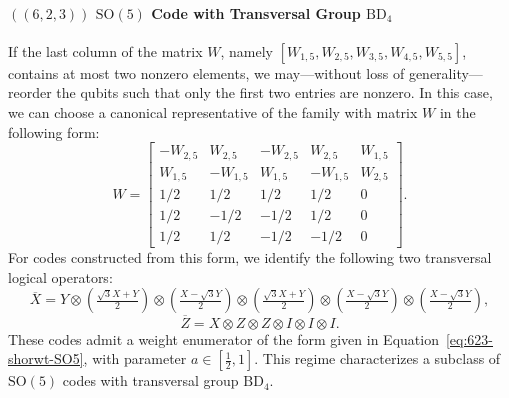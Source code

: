 \documentclass[8pt]{article}
\theoremstyle{definition}
\begin{document}
\paragraph{\texorpdfstring{$((6,2,3))$}{((6,2,3))} \texorpdfstring{$\mathrm{SO}(5)$}{SO(5)} Code with Transversal Group \texorpdfstring{$\mathrm{BD}_4$}{BD₄}}If the last column of the matrix \(W\), namely \([W_{1,5}, W_{2,5}, W_{3,5}, W_{4,5}, W_{5,5}]\), contains at most two nonzero elements, we may—without loss of generality—reorder the qubits such that only the first two entries are nonzero. In this case, we can choose a canonical representative of the family with matrix \(W\) in the following form:
\[ W=\begin{bmatrix}
        -W_{2,5} & W_{2,5}  & -W_{2,5} & W_{2,5}  & W_{1,5} \\
        W_{1,5}  & -W_{1,5} & W_{1,5}  & -W_{1,5} & W_{2,5} \\
        1/2      & 1/2      & 1/2      & 1/2      & 0       \\
        1/2      & -1/2     & -1/2     & 1/2      & 0       \\
        1/2      & 1/2      & -1/2     & -1/2     & 0
    \end{bmatrix}. \]
For codes constructed from this form, we identify the following two transversal logical operators:
\[ \overline{X}=Y\otimes\left(\tfrac{\sqrt{3}X+Y}{2}\right)\otimes\left(\tfrac{X-\sqrt{3}Y}{2}\right)\otimes\left(\tfrac{\sqrt{3}X+Y}{2}\right)\otimes\left(\tfrac{X-\sqrt{3}Y}{2}\right)\otimes\left(\tfrac{X-\sqrt{3}Y}{2}\right), \]
\[ \overline{Z}=X\otimes Z\otimes Z\otimes I\otimes I\otimes I.\]
These codes admit a weight enumerator of the form given in Equation~\eqref{eq:623-shorwt-SO5}, with parameter \(a \in \left[\tfrac{1}{2}, 1\right]\). This regime characterizes a subclass of \(\mathrm{SO}(5)\) codes with transversal group \(\mathrm{BD}_4\).
\end{document}
